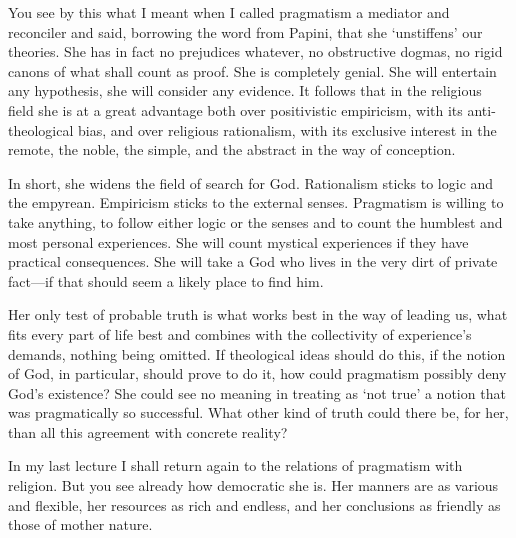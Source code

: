 You see by this what I meant when I called pragmatism a mediator and
reconciler and said, borrowing the word from Papini, that she
`unstiffens' our theories. She has in fact no prejudices whatever, no
obstructive dogmas, no rigid canons of what shall count as proof. She
is completely genial. She will entertain any hypothesis, she will
consider any evidence. It follows that in the religious field she is
at a great advantage both over positivistic empiricism, with its
anti-theological bias, and over religious rationalism, with its
exclusive interest  in the remote, the noble, the simple, and
the abstract in the way of conception.

In short, she widens the field of search for God. Rationalism sticks
to logic and the empyrean. Empiricism sticks to the external senses.
Pragmatism is willing to take anything, to follow either logic or the
senses and to count the humblest and most personal experiences. She
will count mystical experiences if they have practical consequences.
She will take a God who lives in the very dirt of private fact---if
that should seem a likely place to find him.

Her only test of probable truth is what works best in the way of
leading us, what fits every part of life best and combines with the
collectivity of experience's demands, nothing being omitted. If
theological ideas should do this, if the notion of God, in particular,
should prove to do it, how could pragmatism possibly deny God's
existence? She could see no meaning in treating as `not true' a notion
that was pragmatically so successful. What other kind of truth could
there be, for her, than all this agreement with concrete reality?

In my last lecture I shall return again to the relations of
pragmatism with religion. But you see already how democratic she is.
Her manners are as various and flexible, her resources as rich and
endless, and her conclusions as friendly as those of mother nature.

